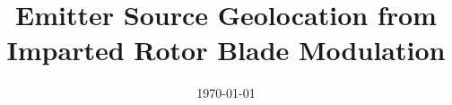 \documentclass[a4paper, 14pt, oneside]{Thesis}  %
\begin{document}
\title  {Emitter Source Geolocation from Imparted Rotor Blade Modulation}
\addresses  {\groupname\\\deptname\\\univname}  %
\date       {\today}
\subject    {}
\keywords   {}
\maketitle

\fancyhead{}  %
\rhead{\thepage}  %
\lhead{}  %
\pagestyle{fancy}  %
\end{document}
